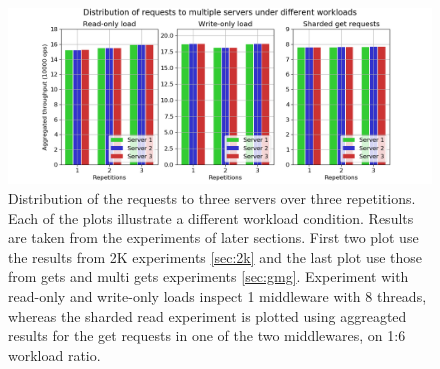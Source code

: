 \documentclass[11pt,a4paper]{article}
\begin{document}

\begin{figure}[h]
  \centering
  \includegraphics[width=1.0\linewidth,trim={0px 0px 0px 0px},clip]{img/plot/equal-load-all.png}
\caption{Distribution of the requests to three servers over three repetitions. Each of the plots illustrate a different workload condition. Results are taken from the experiments of later sections. First two plot use the results from 2K experiments \ref{sec:2k} and the last plot use those from gets and multi gets experiments \ref{sec:gmg}. Experiment with read-only and write-only loads inspect 1 middleware with 8 threads, whereas the sharded read experiment is plotted using aggreagted results for the get requests in one of the two middlewares, on 1:6 workload ratio.}
\label{fig:equal-load}
\end{figure}
\end{document}
